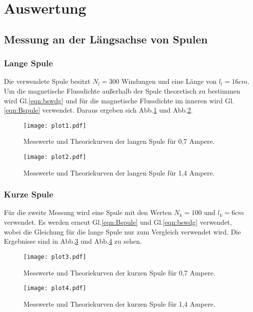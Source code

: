 \section{Auswertung}
\label{sec:Auswertung}

\subsection{Messung an der Längsachse von Spulen}

\subsubsection{Lange Spule}
Die verwendete Spule besitzt $N_l = 300$ Windungen und eine Länge von $l_l = 16cm$.
Um die magnetische Flussdichte außerhalb der Spule theoretisch zu bestimmen wird Gl.\ref{eqn:bswdg}
und für die magnetische Flussdichte im inneren wird Gl.\ref{eqn:Bspule} verwendet.
Daraus ergeben sich Abb.\ref{fig:plot1} und Abb.\ref{fig:plot2}.
\begin{figure}
  \centering
  \texttt{[image: plot1.pdf]}
  \caption{Messwerte und Theoriekurven der langen Spule für 0,7 Ampere.}
  \label{fig:plot1}
\end{figure}
\begin{figure}
  \centering
  \texttt{[image: plot2.pdf]}
  \caption{Messwerte und Theoriekurven der langen Spule für 1,4 Ampere.}
  \label{fig:plot2}
\end{figure}

\subsubsection{Kurze Spule}
Für die zweite Messung wird eine Spule mit den Werten $N_k = 100$ und $l_k = 6cm$
verwendet. Es werden erneut Gl.\ref{eqn:Bspule} und Gl.\ref{eqn:bswdg} verwendet, wobei
die Gleichung für die lange Spule nur zum Vergleich verwendet wird.
Die Ergebnisse sind in Abb.\ref{fig:plot3} und Abb.\ref{fig:plot4} zu sehen.

\begin{figure}
  \centering
  \texttt{[image: plot3.pdf]}
  \caption{Messwerte und Theoriekurven der kurzen Spule für 0,7 Ampere.}
  \label{fig:plot3}
\end{figure}
\begin{figure}
  \centering
  \texttt{[image: plot4.pdf]}
  \caption{Messwerte und Theoriekurven der kurzen Spule für 1,4 Ampere.}
  \label{fig:plot4}
\end{figure}

